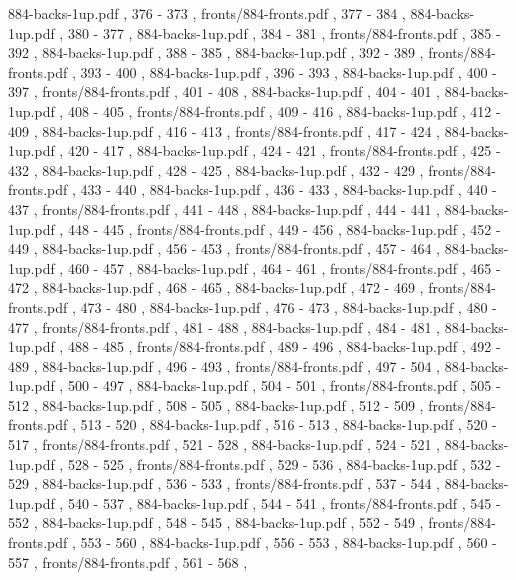 \documentclass[letterpaper]{article}
\begin{document}
{			884-backs-1up.pdf		,	376	-	373	,
			fronts/884-fronts.pdf	,	377	-	384	,
			884-backs-1up.pdf		,	380	-	377	,
			884-backs-1up.pdf		,	384	-	381	,
			fronts/884-fronts.pdf	,	385	-	392	,
			884-backs-1up.pdf		,	388	-	385	,
			884-backs-1up.pdf		,	392	-	389	,
			fronts/884-fronts.pdf	,	393	-	400	,
			884-backs-1up.pdf		,	396	-	393	,
			884-backs-1up.pdf		,	400	-	397	,
			fronts/884-fronts.pdf	,	401	-	408	,
			884-backs-1up.pdf		,	404	-	401	,
			884-backs-1up.pdf		,	408	-	405	,
			fronts/884-fronts.pdf	,	409	-	416	,
			884-backs-1up.pdf		,	412	-	409	,
			884-backs-1up.pdf		,	416	-	413	,
			fronts/884-fronts.pdf	,	417	-	424	,
			884-backs-1up.pdf		,	420	-	417	,
			884-backs-1up.pdf		,	424	-	421	,
			fronts/884-fronts.pdf	,	425	-	432	,
			884-backs-1up.pdf		,	428	-	425	,
			884-backs-1up.pdf		,	432	-	429	,
			fronts/884-fronts.pdf	,	433	-	440	,
			884-backs-1up.pdf		,	436	-	433	,
			884-backs-1up.pdf		,	440	-	437	,
			fronts/884-fronts.pdf	,	441	-	448	,
			884-backs-1up.pdf		,	444	-	441	,
			884-backs-1up.pdf		,	448	-	445	,
			fronts/884-fronts.pdf	,	449	-	456	,
			884-backs-1up.pdf		,	452	-	449	,
			884-backs-1up.pdf		,	456	-	453	,
			fronts/884-fronts.pdf	,	457	-	464	,
			884-backs-1up.pdf		,	460	-	457	,
			884-backs-1up.pdf		,	464	-	461	,
			fronts/884-fronts.pdf	,	465	-	472	,
			884-backs-1up.pdf		,	468	-	465	,
			884-backs-1up.pdf		,	472	-	469	,
			fronts/884-fronts.pdf	,	473	-	480	,
			884-backs-1up.pdf		,	476	-	473	,
			884-backs-1up.pdf		,	480	-	477	,
			fronts/884-fronts.pdf	,	481	-	488	,
			884-backs-1up.pdf		,	484	-	481	,
			884-backs-1up.pdf		,	488	-	485	,
			fronts/884-fronts.pdf	,	489	-	496	,
			884-backs-1up.pdf		,	492	-	489	,
			884-backs-1up.pdf		,	496	-	493	,
			fronts/884-fronts.pdf	,	497	-	504	,
			884-backs-1up.pdf		,	500	-	497	,
			884-backs-1up.pdf		,	504	-	501	,
			fronts/884-fronts.pdf	,	505	-	512	,
			884-backs-1up.pdf		,	508	-	505	,
			884-backs-1up.pdf		,	512	-	509	,
			fronts/884-fronts.pdf	,	513	-	520	,
			884-backs-1up.pdf		,	516	-	513	,
			884-backs-1up.pdf		,	520	-	517	,
			fronts/884-fronts.pdf	,	521	-	528	,
			884-backs-1up.pdf		,	524	-	521	,
			884-backs-1up.pdf		,	528	-	525	,
			fronts/884-fronts.pdf	,	529	-	536	,
			884-backs-1up.pdf		,	532	-	529	,
			884-backs-1up.pdf		,	536	-	533	,
			fronts/884-fronts.pdf	,	537	-	544	,
			884-backs-1up.pdf		,	540	-	537	,
			884-backs-1up.pdf		,	544	-	541	,
			fronts/884-fronts.pdf	,	545	-	552	,
			884-backs-1up.pdf		,	548	-	545	,
			884-backs-1up.pdf		,	552	-	549	,
			fronts/884-fronts.pdf	,	553	-	560	,
			884-backs-1up.pdf		,	556	-	553	,
			884-backs-1up.pdf		,	560	-	557	,
			fronts/884-fronts.pdf	,	561	-	568	,
}
\end{document}
